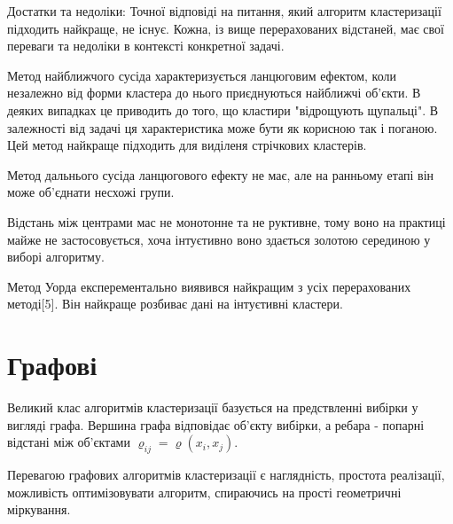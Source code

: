 \documentclass[a4paper,14pt,russian]{extreport}
\begin{document}
\par Достатки та недоліки: 
	Точної відповіді на питання, який алгоритм кластеризації підходить найкраще, не існує. Кожна, із вище перерахованих відстаней, має свої переваги та недоліки в контексті конкретної задачі. \par 
	Метод найближчого сусіда характеризується ланцюговим ефектом, коли незалежно від форми кластера до нього приєднуються найближчі об'єкти. В деяких випадках це приводить до того, що кластири "відрощують щупальці". В залежності від задачі ця характеристика може бути як корисною так і поганою. Цей метод найкраще підходить для виділеня стрічкових кластерів.
	\par 
	Метод дальнього сусіда ланцюгового ефекту не має, але на ранньому етапі він може об'єднати несхожі групи. \par 
	Відстань між центрами мас не монотонне та не руктивне, тому воно на практиці майже не застосовується, хоча інтуєтивно воно здається золотою серединою у виборі алгоритму. \par 
	Метод Уорда експерементально виявився найкращим з усіх перерахованих методі[5]. Він найкраще розбиває дані на інтуєтивні кластери.
	\section{Графові}
	Великий клас алгоритмів кластеризації базується на предствленні вибірки у вигляді графа. Вершина графа відповідає об'єкту вибірки, а ребара - попарні відстані між об'єктами $ \varrho_{ij} = \varrho(x_i, x_j)$. \par 
	Перевагою графових алгоритмів кластеризації є наглядність, простота реалізації, можливість оптимізовувати алгоритм, спираючись на прості геометричні міркування. 
	
\end{document}
